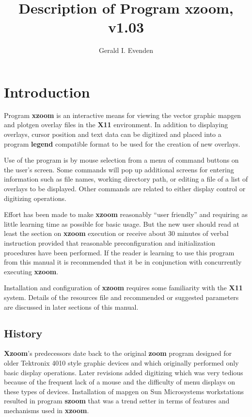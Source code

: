 \title{Description of Program {\bf xzoom}, v1.03}
\author{Gerald I. Evenden}

\maketitle
\vspace{1.25in}
\section{Introduction}
Program {\bf xzoom} is an interactive means for viewing the
vector graphic {\sc mapgen} and {\sc plotgen} overlay files
in the {\bf X11} environment.
In addition to displaying overlays, cursor position and
text data can be digitized and placed into a program {\bf legend}
compatible format to be used for the creation of new overlays.

Use of the program is by mouse selection from a
menu of command buttons on the user's screen.
Some commands will pop up additional screens for entering
information such as file names, working directory path, or
editing a file of a list of overlays to be displayed.
Other commands are related to either display control or digitizing
operations.

Effort has been made to make {\bf xzoom} reasonably ``user friendly''
and requiring as little learning time as possible for basic usage.
But the new user should read at least the section on {\bf xzoom}
execution or receive about 30 minutes of verbal instruction provided that
reasonable preconfiguration and initialization procedures
have been performed.
If the reader is learning to use this program from this manual
it is recommended that it be in conjunction with concurrently
executing {\bf xzoom}.

Installation and configuration of {\bf xzoom} requires some
familiarity with the {\bf X11} system.
Details of the resources file and recommended or suggested
parameters are discussed in later sections of this manual.

\subsection{History}
{\bf Xzoom}'s predecessors date back to the original {\bf zoom}
program designed for older Tektronix 4010 style graphic devices and which
originally performed only basic display operations.
Later revisions added digitizing which was very tedious
because of the frequent lack of a mouse and the difficulty
of menu displays on these types of devices.
Installation of {\sc mapgen} on Sun Microsystems workstations
resulted in program {\bf szoom} that was a trend setter in
terms of features and mechanisms used in {\bf xzoom}.

